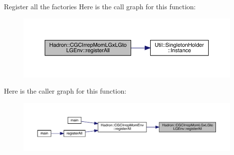 Register all the factories Here is the call graph for this function\+:\nopagebreak
\begin{figure}[H]
\begin{center}
\leavevmode
\includegraphics[width=350pt]{de/dae/namespaceHadron_1_1CGCIrrepMomLGxLGtoLGEnv_ab765f2f3a5f090ad99642c37e973a15d_cgraph}
\end{center}
\end{figure}
Here is the caller graph for this function\+:\nopagebreak
\begin{figure}[H]
\begin{center}
\leavevmode
\includegraphics[width=350pt]{de/dae/namespaceHadron_1_1CGCIrrepMomLGxLGtoLGEnv_ab765f2f3a5f090ad99642c37e973a15d_icgraph}
\end{center}
\end{figure}
